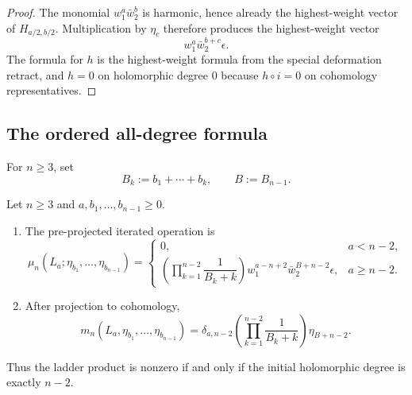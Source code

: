 \begin{proof}
The monomial $w_1^a\bar w_2^b$ is harmonic, hence already the highest-weight vector of $H_{a/2,b/2}$. Multiplication by $\eta_c$ therefore produces the highest-weight vector
\[
w_1^a\bar w_2^{b+c}\epsilon.
\]
The formula for $h$ is the highest-weight formula from the special deformation retract, and $h=0$ on holomorphic degree $0$ because $h\circ i=0$ on cohomology representatives.
\end{proof}

\subsection{The ordered all-degree formula}
\label{sec:cbt-ordered-all-degree}

For $n\ge3$, set
\[
B_k:=b_1+\cdots+b_k,
\qquad
B:=B_{n-1}.
\]

\begin{theorem}
\label{thm:cbt-bf-ladder}
\ClaimStatusProvedHere
Let $n\ge3$ and $a,b_1,\dots,b_{n-1}\ge0$.
\begin{enumerate}[label=\textup{(\roman*)},leftmargin=2em]
\item The pre-projected iterated operation is
\[
\mu_n(L_a;\eta_{b_1},\dots,\eta_{b_{n-1}})
=
\begin{cases}
0, & a<n-2,\\[2ex]
\left(\prod_{k=1}^{n-2}\dfrac{1}{B_k+k}\right)
w_1^{a-n+2}\bar w_2^{B+n-2}\epsilon, & a\ge n-2.
\end{cases}
\]
\item After projection to cohomology,
\[
m_n(L_a,\eta_{b_1},\dots,\eta_{b_{n-1}})
=
\delta_{a,n-2}
\left(\prod_{k=1}^{n-2}\frac{1}{B_k+k}\right)\eta_{B+n-2}.
\]
\end{enumerate}
Thus the ladder product is nonzero if and only if the initial holomorphic degree is exactly $n-2$.
\end{theorem}


